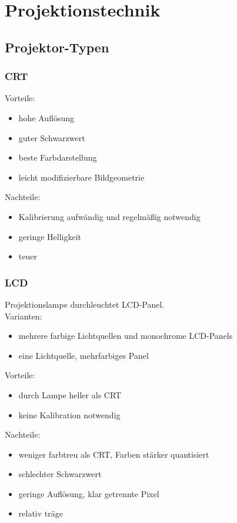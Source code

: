 \documentclass[a4paper, 12pt]{article}
\begin{document}
\section{Projektionstechnik}


\subsection{Projektor-Typen}

\subsubsection*{CRT}
Vorteile:
\begin{itemize}
  \item hohe Auflösung
  \item guter Schwarzwert
  \item beste Farbdarstellung
  \item leicht modifizierbare Bildgeometrie
\end{itemize}
Nachteile:
\begin{itemize}
  \item Kalibrierung aufwändig und regelmäßig notwendig
  \item geringe Helligkeit
  \item teuer
\end{itemize}

\subsubsection*{LCD}
Projektionslampe durchleuchtet LCD-Panel.\\
Varianten:
\begin{itemize}
  \item mehrere farbige Lichtquellen und monochrome LCD-Panels
  \item eine Lichtquelle, mehrfarbiges Panel
\end{itemize}
Vorteile:
\begin{itemize}
  \item durch Lampe heller als CRT
  \item keine Kalibration notwendig
\end{itemize}
Nachteile:
\begin{itemize}
  \item weniger farbtreu als CRT, Farben stärker quantisiert
  \item schlechter Schwarzwert
  \item geringe Auflösung, klar getrennte Pixel
  \item relativ träge
\end{itemize}
\end{document}
